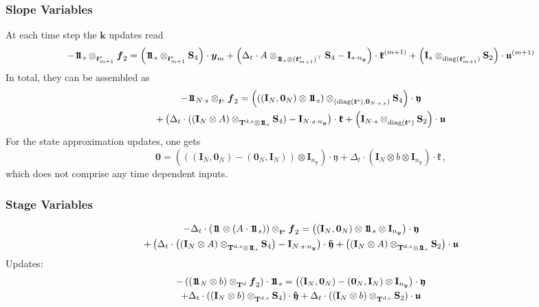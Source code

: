 \documentclass{article}
\newcommand{\tp}{\top}%
\newcommand{\kron}{\otimes}%
\newcommand{\dkron}[2][]{\mathbin{\kron_{#2}^{#1}}}%
\newcommand{\diag}{\mathop{\mathrm{diag}}}%
\newcommand{\vectorfont}[1]{\boldsymbol{#1}}%
\newcommand{\greekvectorfont}[1]{\boldsymbol{#1}}%
\newcommand{\matrixfont}[1]{\mathbf{#1}}%
\newcommand{\fvec}{\vectorfont{f}}
\newcommand{\kvec}{\vectorfont{k}}
\newcommand{\tvec}{\vectorfont{t}}
\newcommand{\yvec}{\vectorfont{y}}
\newcommand{\kfrakvec}{\vectorfont{\mathfrak{k}}}
\newcommand{\ufrakvec}{\vectorfont{\mathfrak{u}}}
\newcommand{\yfrakvec}{\vectorfont{\mathfrak{y}}}
\newcommand{\tildeyfrakvec}{\vectorfont{\tilde{\mathfrak{y}}}}
\newcommand{\nullvec}{\greekvectorfont{0}}
\newcommand{\einsvec}{\vectorfont{1}\negthinspace\negthinspace\vectorfont{1}} %
\newcommand{\Imat}{\matrixfont{I}}%
\newcommand{\Smat}{\matrixfont{S}}
\newcommand{\Tmat}{\matrixfont{T}}
\newcommand{\Nullmat}{\matrixfont{0}}
\begin{document}
\subsubsection*{Slope Variables}
At each time step the $\kvec$ updates read
\[
-\einsvec_s \dkron{\tvec_{m+1}^{\mathrm{s}}} \fvec_2
 = \left(\einsvec_s \dkron{\tvec_{m+1}^{\mathrm{s}}} \Smat_4 \right)\cdot \yvec_m +
 \left( \Delta_t \cdot A \dkron{\einsvec_s \kron (\tvec_{m+1}^{\mathrm{s}})^{\tp}} \Smat_4  - \Imat_{s \cdot n_{\yvec}}\right)\cdot \kfrakvec^{(m+1)} + \left( \Imat_s \dkron{\diag (\tvec_{m+1}^{\mathrm{s}})} \Smat_2 \right)\cdot \ufrakvec^{(m+1)}
\]
In total, they can be assembled as
\begin{multline*}
-\einsvec_{N\cdot s} \dkron{\tvec^{\mathrm{s}}} \fvec_2 
=
\left( \left( (\Imat_N, \nullvec_N) \kron \einsvec_s \right) \dkron{(\diag (\tvec^{\mathrm{s}}), \Nullmat_{N \cdot s,s})} \Smat_4 \right) \cdot \yfrakvec 
\\
+ \left(\Delta_t \cdot  ((\Imat_N \kron A) \dkron{\Tmat^{\mathrm{d}, \mathrm{s}} \kron \einsvec_s} \Smat_4)   - \Imat_{N\cdot s \cdot n_{\yvec}}\right) \cdot \kfrakvec
+ \left( \Imat_{N \cdot s} \dkron{\diag(\tvec^{\mathrm{s}})}  \Smat_2\right) \cdot \ufrakvec 
\end{multline*}
For the state approximation updates, one gets
\[
\nullvec 
=
\left(
((\Imat_N, \nullvec_N) - (\nullvec_N, \Imat_N)) \kron \Imat_{n_{\yvec}}
\right) \cdot \yfrakvec 
+ \Delta_t \cdot  (\Imat_N \kron b \kron \Imat_{n_{\yvec}}) \cdot \kfrakvec\,,
\]
which does not comprise any time dependent inputs.

\subsubsection*{Stage Variables}
\begin{multline*}
-\Delta_t \cdot \left(\einsvec \kron (A \cdot \einsvec_s) \right) \dkron{\tvec^{\mathrm{s}}} \fvec_2
= \left((\Imat_N,\nullvec_N) \kron \einsvec_s \kron \Imat_{n_{\yvec}}  \right) \cdot \yfrakvec
\\
+ \left(\Delta_t \cdot \left((\Imat_{N} \kron A) \dkron{\Tmat^{\mathrm{d},\mathrm{s}} \kron \einsvec_s} \Smat_4  \right)  -\Imat_{N \cdot s \cdot n_{\yvec}}\right) \cdot \tildeyfrakvec
+\left( (\Imat_N \kron A) \dkron{\Tmat^{\mathrm{d},\mathrm{s}} \kron \einsvec_s} \Smat_2 \right)\cdot \ufrakvec
\end{multline*}
Updates:
\begin{multline*}
- \left( (\einsvec_N \kron  b) \dkron{\Tmat^{\mathrm{d}}} \fvec_2 \right) \cdot \einsvec_s
=
\left((\Imat_N,\nullvec_N)-(\nullvec_N,\Imat_N)\kron \Imat_{n_{\yvec}} \right)\cdot \yfrakvec
\\
+ \Delta_t \cdot \left((\Imat_{N} \kron b)\dkron{\Tmat^{\mathrm{d},\mathrm{s}}}\Smat_4   \right)\cdot \tildeyfrakvec
+ \Delta_t \cdot \left((\Imat_{N} \kron b)\dkron{\Tmat^{\mathrm{d},\mathrm{s}}}\Smat_2 \right) \cdot \ufrakvec
\end{multline*}
\end{document}
